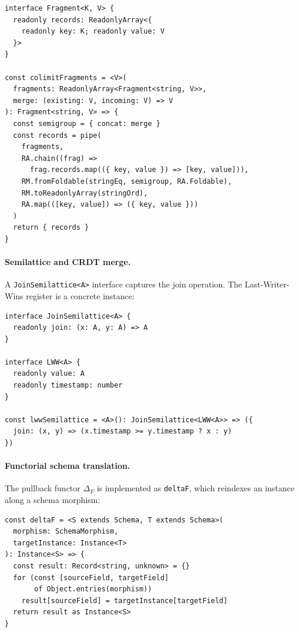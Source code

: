 \documentclass[11pt,a4paper]{article}
\begin{document}
\begin{lstlisting}[caption={Entity resolution via colimit (Semigroup + ReadonlyMap).}]
interface Fragment<K, V> {
  readonly records: ReadonlyArray<{
    readonly key: K; readonly value: V
  }>
}

const colimitFragments = <V>(
  fragments: ReadonlyArray<Fragment<string, V>>,
  merge: (existing: V, incoming: V) => V
): Fragment<string, V> => {
  const semigroup = { concat: merge }
  const records = pipe(
    fragments,
    RA.chain((frag) =>
      frag.records.map(({ key, value }) => [key, value])),
    RM.fromFoldable(stringEq, semigroup, RA.Foldable),
    RM.toReadonlyArray(stringOrd),
    RA.map(([key, value]) => ({ key, value }))
  )
  return { records }
}
\end{lstlisting}

\paragraph{Semilattice and CRDT merge.}
A \texttt{JoinSemilattice<A>} interface captures the join operation.
The Last-Writer-Wins register is a concrete instance:

\begin{lstlisting}[caption={LWW register as a join-semilattice.}]
interface JoinSemilattice<A> {
  readonly join: (x: A, y: A) => A
}

interface LWW<A> {
  readonly value: A
  readonly timestamp: number
}

const lwwSemilattice = <A>(): JoinSemilattice<LWW<A>> => ({
  join: (x, y) => (x.timestamp >= y.timestamp ? x : y)
})
\end{lstlisting}

\paragraph{Functorial schema translation.}
The pullback functor $\Delta_F$ is implemented as \texttt{deltaF},
which reindexes an instance along a schema morphism:

\begin{lstlisting}[caption={$\Delta_F$: pullback / reindexing.}]
const deltaF = <S extends Schema, T extends Schema>(
  morphism: SchemaMorphism,
  targetInstance: Instance<T>
): Instance<S> => {
  const result: Record<string, unknown> = {}
  for (const [sourceField, targetField]
       of Object.entries(morphism))
    result[sourceField] = targetInstance[targetField]
  return result as Instance<S>
}
\end{lstlisting}
\end{document}
